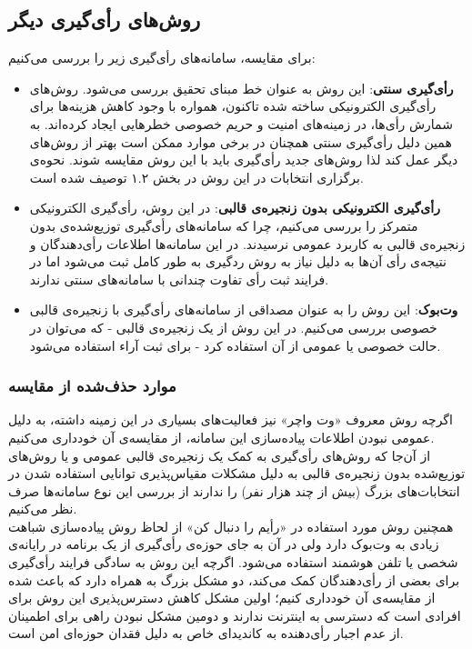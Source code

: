 \subsection{روش‌های رأی‌گیری دیگر}
برای مقایسه، سامانه‌های رأی‌گیری زیر را بررسی می‌کنیم:
\begin{itemize}
	\item 
	\textbf{رأی‌گیری سنتی}:
	این روش به عنوان خط مبنای تحقیق بررسی می‌شود. روش‌های رأی‌گیری الکترونیکی ساخته شده تاکنون، همواره با وجود کاهش هزینه‌ها برای شمارش رأی‌ها، در زمینه‌های امنیت و حریم خصوصی خطرهایی ایجاد کرده‌اند. به همین دلیل رأی‌گیری سنتی همچنان در برخی موارد ممکن است بهتر از روش‌های دیگر عمل کند لذا روش‌های جدید رأی‌گیری باید با این روش مقایسه شوند. نحوه‌ی برگزاری انتخابات در این روش در بخش ۱.۲ توصیف شده است. 
	\item \textbf{رأی‌‌گیری الکترونیکی بدون زنجیره‌ی قالبی}:
	در این روش، رأی‌گیری الکترونیکی متمرکز را بررسی می‌کنیم، چرا که سامانه‌های رأی‌گیری توزیع‌شده‌ی بدون زنجیره‌ی قالبی به کاربرد عمومی نرسیدند. در این سامانه‌ها اطلاعات رأی‌دهندگان و نتیجه‌ی رأی آن‌ها به دلیل نیاز به روش ردگیری به طور کامل ثبت می‌شود اما در فرایند ثبت رأی تفاوت چندانی با سامانه‌های سنتی ندارند.
 	\item \textbf{وت‌بوک}:
 	این روش را به عنوان مصداقی از سامانه‌های رأی‌گیری با زنجیره‌ی قالبی خصوصی بررسی می‌کنیم. 
 	در این روش از یک‌ زنجیره‌ی قالبی - که می‌توان در حالت خصوصی یا عمومی از آن استفاده کرد - برای ثبت آراء استفاده می‌شود. 
\end{itemize}
\subsubsection{موارد حذف‌شده از مقایسه}
 	 اگرچه روش‌ معروف «وت واچر»
 	  نیز فعالیت‌های بسیاری در این زمینه داشته، به دلیل عمومی نبودن اطلاعات پیاده‌سازی این سامانه‌، از مقایسه‌ی آن خود‌داری می‌کنیم. 
 	 \\
 	 از آن‌جا که روش‌های رأی‌گیری به کمک یک زنجیره‌ی قالبی عمومی و یا روش‌های توزیع‌شده بدون زنجیره‌ی قالبی به دلیل مشکلات مقیاس‌پذیری توانایی استفاده شدن در انتخابات‌های بزرگ (بیش از چند هزار نفر) را ندارند از بررسی این نوع سامانه‌ها صرف نظر می‌کنیم.
 	 \\
 	 همچنین روش مورد استفاده در «رأیم را دنبال کن»
 	  از لحاظ روش پیاده‌سازی شباهت زیادی به وت‌بوک دارد ولی در آن به جای حوزه‌ی رأی‌گیری از یک برنامه در رایانه‌ی شخصی یا تلفن هوشمند استفاده می‌شود. اگرچه این روش به سادگی فرایند رأی‌گیری برای بعضی از رأی‌دهندگان کمک می‌کند، دو مشکل بزرگ به همراه دارد که باعث شده از مقایسه‌ی آن خودداری کنیم؛ اولین مشکل کاهش دسترس‌پذیری این روش برای افرادی است که دسترسی به اینترنت ندارند و دومین مشکل نبودن راهی برای اطمینان از عدم اجبار رأی‌دهنده به کاندیدای خاص به دلیل فقدان حوزه‌ای امن است.
